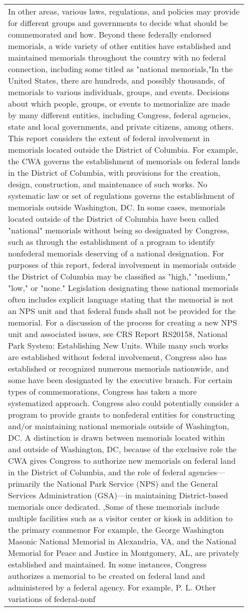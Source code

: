 \documentclass[11pt,table]{article}
\begin{document}
\begin{table*}[ht]
\begin{tabular}{p{0.95\linewidth}}
    In other areas, various laws, regulations, and policies may provide for different groups and governments to decide what should be commemorated and how. Beyond these federally endorsed memorials, a wide variety of other entities have established and maintained memorials throughout the country with no federal connection, including some titled as "national memorials,"In the United States, there are hundreds, and possibly thousands, of memorials to various individuals, groups, and events. Decisions about which people, groups, or events to memorialize are made by many different entities, including Congress, federal agencies, state and local governments, and private citizens, among others. This report considers the extent of federal involvement in memorials located outside the District of Columbia. For example, the CWA governs the establishment of memorials on federal lands in the District of Columbia, with provisions for the creation, design, construction, and maintenance of such works. No systematic law or set of regulations governs the establishment of memorials outside Washington, DC. In some cases, memorials located outside of the District of Columbia have been called "national" memorials without being so designated by Congress, such as through the establishment of a program to identify nonfederal memorials deserving of a national designation. For purposes of this report, federal involvement in memorials outside the District of Columbia may be classified as "high," "medium," "low," or "none." Legislation designating these national memorials often includes explicit language stating that the memorial is not an NPS unit and that federal funds shall not be provided for the memorial. For a discussion of the process for creating a new NPS unit and associated issues, see CRS Report RS20158, National Park System: Establishing New Units. While many such works are established without federal involvement, Congress also has established or recognized numerous memorials nationwide, and some have been designated by the executive branch. For certain types of commemorations, Congress has taken a more systematized approach. Congress also could potentially consider a program to provide grants to nonfederal entities for constructing and/or maintaining national memorials outside of Washington, DC. A distinction is drawn between memorials located within and outside of Washington, DC, because of the exclusive role the CWA gives Congress to authorize new memorials on federal land in the District of Columbia, and the role of federal agencies—primarily the National Park Service (NPS) and the General Services Administration (GSA)—in maintaining District-based memorials once dedicated. ,Some of these memorials include multiple facilities such as a visitor center or kiosk in addition to the primary commemor For example, the George Washington Masonic National Memorial in Alexandria, VA, and the National Memorial for Peace and Justice in Montgomery, AL, are privately established and maintained. In some instances, Congress authorizes a memorial to be created on federal land and administered by a federal agency. For example, P. L. Other variations of federal-nonf\\

\end{tabular}
\end{table*}
\end{document}
